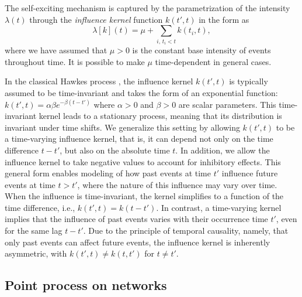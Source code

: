 \documentclass[11pt]{article}
\theoremstyle{remark}
\theoremstyle{plain}
\begin{document}
The self-exciting mechanism  is captured by the parametrization of the intensity $\lambda(t)$ through the 
{\it influence kernel} function $k(t',t)$ in the form as
\begin{equation}\label{eq:lambda-kernel-old-hawkes}
\lambda [k] (t)  = \mu + \sum_{i, \, t_i < t} k(t_i, t),
\end{equation}
where we have assumed that $\mu > 0$ is the constant base intensity of events throughout time. 
It is possible to make $\mu$ time-dependent in general cases. 


In the classical Hawkes process \cite{hawkes1971point, hawkes1974cluster}, the influence kernel $k(t', t)$ is typically assumed to be time-invariant and takes the form of an exponential function:
$k(t', t) = \alpha \beta e^{-\beta (t - t')}$
where $\alpha > 0$ and $\beta > 0$ are scalar parameters. This time-invariant kernel leads to a stationary process, meaning that its distribution is invariant under time shifts.
%
We generalize this setting by allowing $k(t', t)$ to be a time-varying influence kernel, that is, it can depend not only on the time difference $t - t'$, but also on the absolute time $t$. In addition, we allow the influence kernel to take negative values to account for inhibitory effects. This general form enables modeling of how past events at time $t'$ influence future events at time $t > t'$, where the nature of this influence may vary over time.
%
When the influence is time-invariant, the kernel simplifies to a function of the time difference, i.e., $k(t', t) = k(t - t')$. In contrast, a time-varying kernel implies that the influence of past events varies with their occurrence time $t'$, even for the same lag $t - t'$.
%
Due to the principle of temporal causality, namely, that only past events can affect future events, the influence kernel is inherently asymmetric, with $k(t', t) \neq k(t, t')$ for $t \ne t'$.




\subsection{Point process on networks}
\end{document}
